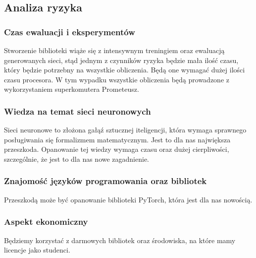 \subsection{Analiza ryzyka}

\subsubsection{Czas ewaluacji i eksperymentów}
Stworzenie biblioteki wiąże się z intensywnym treningiem oraz ewaluacją
generowanych sieci, stąd jednym z czynników ryzyka będzie mała ilość czasu, który będzie potrzebny na wszystkie 
obliczenia. Będą one wymagać dużej ilości czasu procesora. W tym wypadku wszystkie obliczenia 
będą prowadzone z wykorzystaniem superkomutera Prometeusz.

\subsubsection{Wiedza na temat sieci neuronowych}
Sieci neuronowe to złożona gałąź sztucznej iteligencji, która wymaga sprawnego posługiwania się formalizmem matematycznym.
Jest to dla nas największa przeszkoda. Opanowanie tej wiedzy wymaga czasu oraz dużej cierpliwości, 
szczególnie, że jest to dla nas nowe zagadnienie.

\subsubsection{Znajomość języków programowania oraz bibliotek }
Przeszkodą może być opanowanie biblioteki PyTorch, która jest dla nas nowością.

\subsubsection{Aspekt ekonomiczny }
Będziemy korzystać z darmowych bibliotek oraz środowiska, na które mamy licencje jako studenci.